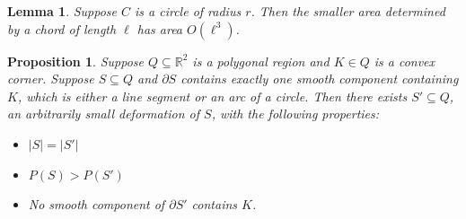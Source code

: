 \documentclass[10pt,a4paper]{amsart}
\newtheorem{proposition}{Proposition}
\newtheorem{lemma}{Lemma}
\begin{document}
\begin{lemma}\label{lem:chordAreaOrder}Suppose $C$ is a circle of radius $r$.  Then the smaller area determined by a chord of length $\ell$ has area  $O(\ell^3)$.
\end{lemma}

\begin{proposition}\label{prop:convexcorner}Suppose $Q\subseteq\mathbb{R}^2$ is a polygonal region and $K\in Q$ is a convex corner.  Suppose $S\subseteq Q$ and $\partial S$ contains exactly one smooth component containing $K$, which is either a line segment or an arc of a circle.  Then there exists $S' \subseteq Q$, an arbitrarily small deformation of $S$, with the following properties:

\begin{itemize}\item $|S| = |S'|$
\item $P(S) > P(S')$
\item No smooth component of $\partial S'$ contains $K$.
\end{itemize}

\end{proposition}
\end{document}
